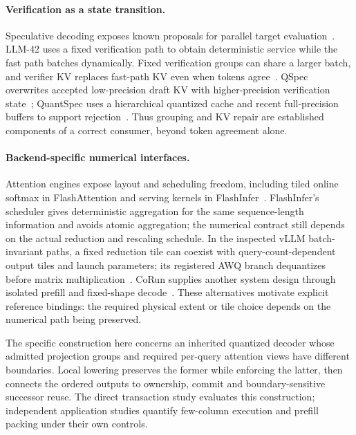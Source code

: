 \paragraph{Verification as a state transition.}
Speculative decoding exposes known proposals for parallel target evaluation~\cite{leviathan2023,chen2023}. LLM-42 uses a fixed verification path to obtain deterministic service while the fast path batches dynamically. Fixed verification groups can share a larger batch, and verifier KV replaces fast-path KV even when tokens agree~\cite{llm42}. QSpec overwrites accepted low-precision draft KV with higher-precision verification state~\cite{qspec}; QuantSpec uses a hierarchical quantized cache and recent full-precision buffers to support rejection~\cite{quantspec}. Thus grouping and KV repair are established components of a correct consumer, beyond token agreement alone.

\paragraph{Backend-specific numerical interfaces.}
Attention engines expose layout and scheduling freedom, including tiled online softmax in FlashAttention and serving kernels in FlashInfer~\cite{flashattention,flashinfer}. FlashInfer's scheduler gives deterministic aggregation for the same sequence-length information and avoids atomic aggregation; the numerical contract still depends on the actual reduction and rescaling schedule. In the inspected vLLM batch-invariant paths, a fixed reduction tile can coexist with query-count-dependent output tiles and launch parameters; its registered AWQ branch dequantizes before matrix multiplication~\cite{vllm_batchinv}. CoRun supplies another system design through isolated prefill and fixed-shape decode~\cite{corun}. These alternatives motivate explicit reference bindings: the required physical extent or tile choice depends on the numerical path being preserved.

The specific construction here concerns an inherited quantized decoder whose admitted projection groups and required per-query attention views have different boundaries. Local lowering preserves the former while enforcing the latter, then connects the ordered outputs to ownership, commit and boundary-sensitive successor reuse. The direct transaction study evaluates this construction; independent application studies quantify few-column execution and prefill packing under their own controls.

